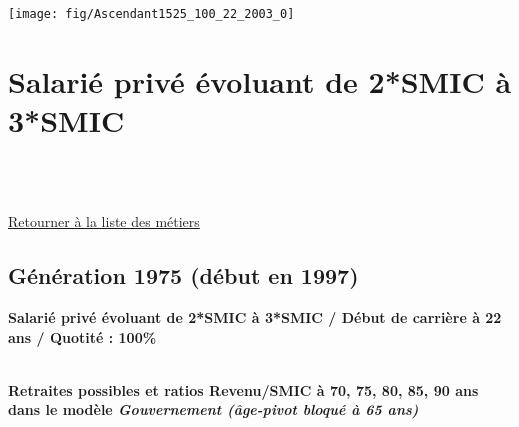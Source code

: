  \vspace{0.1cm} 

 {\hspace{-2.2cm}\texttt{[image: fig/Ascendant1525\_100\_22\_2003\_0]}} 

\newpage 
 
\chapter{Salarié privé évoluant de 2*SMIC à 3*SMIC} 

~\\ 
 


   
 \localtableofcontents 

~\\ 
 
 \hyperlink{page.2}{\noindent Retourner à la liste des métiers}

 \newpage 

\section{Génération 1975 (début en 1997)\label{Ascendant23_100_22_1975_0}} 
 
{\bf \noindent Salarié privé évoluant de 2*SMIC à 3*SMIC / Début de carrière à 22 ans / Quotité : 100\%}  ~ 

 ~\\{\bf \noindent Retraites possibles et ratios Revenu/SMIC à 70, 75, 80, 85, 90 ans dans le modèle \emph{Gouvernement (âge-pivot bloqué à 65 ans)}}  
 
